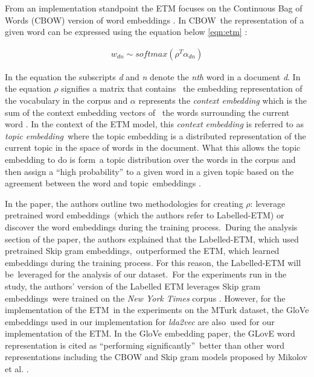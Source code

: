 \documentclass[letterpaper,12pt]{article}
\begin{document}
From an implementation standpoint the ETM focuses on the Continuous Bag of Words (CBOW) version of word embeddings \cite{mikolov2013distributed}. In CBOW\
the representation of a given word can be expressed using the equation below \ref{eqn:etm} \cite{dieng2019topic}: 

\begin{eqnarray}
	\label{eqn:etm}
	w_{dn} \sim softmax(\rho^T\alpha_{dn})
\end{eqnarray}

In the equation the subscripts \emph{d} and \emph{n} denote the \emph{n\-th} word in a document \emph{d}. In the equation $\rho$ signifies a matrix that contains \
the embedding representation of the vocabulary in the corpus and $\alpha$ represents the \emph{context embedding} which is the sum of the context embedding vectors of \
the words surrounding the current word \cite{dieng2019topic}. In the context of the ETM model, this \emph{context embedding} is referred to as \emph{topic embedding}\
where the topic embedding is a distributed representation of the current topic in the space of words in the document. What this allows the topic embedding to do is form\
a topic distribution over the words in the corpus and then assign a ``high probability'' to a given word in a given topic based on the agreement between the word and topic\
embeddings \cite{dieng2019topic}.

In the paper, the authors outline two methodologies for creating $\rho$: leverage pretrained word embeddings\
(which the authors refer to Labelled-ETM) or discover the word embeddings during the training process.\
During the analysis section of the paper, the authors explained that the Labelled-ETM, which used pretrained Skip gram embeddings,\
outperformed the ETM, which learned embeddings during the training process. For this reason, the Labelled-ETM will be\
leveraged for the analysis of our dataset.\
For the experiments run in the study, the authors' version of the Labelled ETM leverages Skip gram embeddings\
were trained on the \emph{New York Times} corpus \cite{sandhaus2008nyt}. However, for the implementation of the ETM\
in the experiments on the MTurk dataset, the GloVe embeddings \cite{pennington2014glove} used in our implementation for \emph{lda2vec} are also\
used for our implementation of the ETM. In the GloVe embedding paper, the GLovE word representation is cited as ``performing significantly''\
better than other word representations including the CBOW and Skip gram models proposed by Mikolov et al. \cite{pennington2014glove}.
\end{document}

